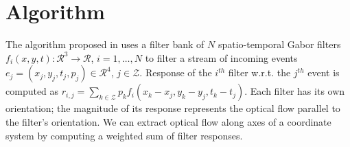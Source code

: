 \newpage
\section{Algorithm}

The algorithm proposed in \cite{Brosch2015} uses a filter bank of $N$ spatio-temporal Gabor filters $f_i(x, y, t) : \mathcal{R}^3 \rightarrow \mathcal{R}$, $i = 1, \ldots, N$ to filter a stream of incoming events $e_j=(x_j,y_j,t_j,p_j) \in \mathcal{R}^4$, $j \in \mathcal{Z}$. 
Response of the $i^{th}$ filter w.r.t. the $j^{th}$ event is computed as $r_{i,j} = \sum_{k \in \mathcal{Z}} p_kf_i(x_k - x_j, y_k - y_j, t_k - t_j)$.
Each filter has its own orientation; the magnitude of its response represents the optical flow parallel to the filter's orientation.
We can extract optical flow along axes of a coordinate system by computing a weighted sum of filter responses.